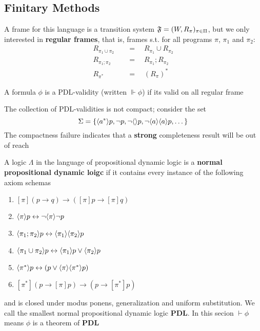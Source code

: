 \documentclass[11pt]{article}
\newcommand{\PDL}{\textbf{PDL}}
\begin{document}
\subsection{Finitary Methods }
\label{sec:org25b74e6}

A frame for this language is a transition system
\(\mathfrak{F}=(W,R_{\pi})_{\pi\in\Pi}\), but we only interested in \textbf{regular frames}, that
is, frames s.t. for all programs \(\pi\), \(\pi_1\) and \(\pi_2\):
\begin{align*}
R_{\pi_1\cup\pi_2}&\quad=\quad R_{\pi_1}\cup R_{\pi_2}\\
R_{\pi_1;\pi_2}&\quad=\quad R_{\pi_1};R_{\pi_2}\\
R_{\pi^*}&\quad=\quad (R_{\pi})^*
\end{align*}

A formula \(\phi\) is a PDL-validity (written \(\Vdash\phi\)) if its valid on all
regular frame

The collection of PDL-validities is not compact; consider the set
\begin{equation*}
\Sigma=\{\langle a^*\rangle p,\neg p,\neg\langle\rangle p,\neg\langle a\rangle\langle a\rangle p,\dots\}
\end{equation*}
The compactness failure indicates that a \textbf{strong} completeness result will be
out of reach


\begin{definition}[]
A logic \(\Lambda\) in the language of propositional dynamic logic is a
\textbf{normal propositional dynamic loigc} if it contains every instance of the
following axiom schemas
\begin{enumerate}
\item \([\pi](p\to q)\to([\pi]p\to[\pi]q)\)
\item \(\langle\pi\rangle p\leftrightarrow\neg\langle\pi\rangle\neg p\)
\item \(\langle\pi_1;\pi_2\rangle p\leftrightarrow\langle\pi_1\rangle\langle\pi_2\rangle p\)
\item \(\langle\pi_1\cup\pi_2\rangle p\leftrightarrow\langle\pi_1\rangle p\vee\langle\pi_2\rangle p\)
\item \(\langle\pi^*\rangle p\leftrightarrow(p\vee\langle\pi\rangle\langle\pi^*\rangle p)\)
\item \([\pi^*](p\to[\pi]p)\to(p\to[\pi^*]p)\)
\end{enumerate}


and is closed under modus ponens, generalization and uniform substitution. We
call the smallest normal propositional dynamic logic \(\PDL\). In this secion
\(\vdash\phi\) means \(\phi\) is a theorem of \(\PDL\)
\end{definition}
\end{document}
